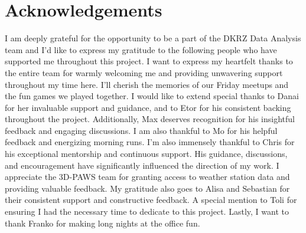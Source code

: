 \section*{Acknowledgements}

I am deeply grateful for the opportunity to be a part of the DKRZ Data Analysis team and I'd like to express my gratitude to the following people who have supported me throughout this project.
I want to express my heartfelt thanks to the entire team for warmly welcoming me and providing unwavering support throughout my time here.
I'll cherish the memories of our Friday meetups and the fun games we played together.
I would like to extend special thanks to Danai for her invaluable support and guidance, and to Etor for his consistent backing throughout the project.
Additionally, Max deserves recognition for his insightful feedback and engaging discussions.
I am also thankful to Mo for his helpful feedback and energizing morning runs.
I'm also immensely thankful to Chris for his exceptional mentorship and continuous support.
His guidance, discussions, and encouragement have significantly influenced the direction of my work.
I appreciate the 3D-PAWS team for granting access to weather station data and providing valuable feedback.
My gratitude also goes to Alisa and Sebastian for their consistent support and constructive feedback.
A special mention to Toli for ensuring I had the necessary time to dedicate to this project.
Lastly, I want to thank Franko for making long nights at the office fun.